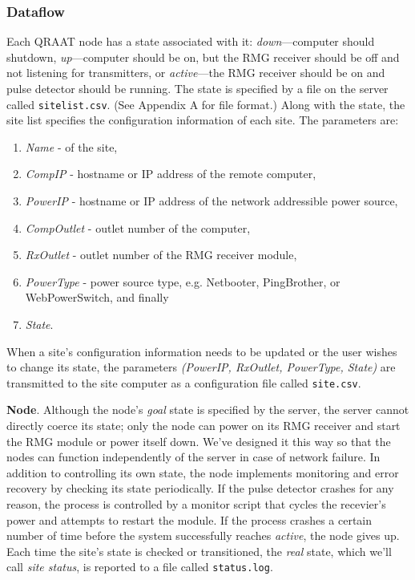 \documentclass[letter]{article}
\begin{document}
\subsubsection{Dataflow}
Each QRAAT node has a state associated with it: \textit{down}---computer should shutdown,
\textit{up}---computer should be on, but the RMG receiver should be off and not listening 
for transmitters, or \textit{active}---the RMG receiver should be on and pulse detector should
be running. The state is specified by a file on the server called \texttt{sitelist.csv}.
(See Appendix A for file format.) Along with the state, the site list specifies the 
configuration information of each site. The parameters are:
\begin{enumerate}
  \item \textit{Name} - of the site, 
  \item \textit{CompIP} - hostname or IP address of the remote computer, 
  \item \textit{PowerIP} - hostname or IP address of the network addressible power source,
  \item \textit{CompOutlet} - outlet number of the computer, 
  \item \textit{RxOutlet} - outlet number of the RMG receiver module, 
  \item \textit{PowerType} - power source type, e.g. Netbooter, PingBrother, or WebPowerSwitch, and finally
  \item \textit{State}.
\end{enumerate}

When a site's configuration information needs to be updated or the user wishes to change 
its state, the parameters \textit{(PowerIP, RxOutlet, PowerType, State)} are transmitted to the
site computer as a configuration file called \texttt{site.csv}. 

\textbf{Node}. Although the node's \textit{goal} state is specified by the server, the server
cannot directly coerce its state; only the node can power on its RMG receiver and start the RMG
module or power itself down. We've designed it this way so that the nodes can function independently
of the server in case of network failure. In addition to controlling its own state, the node 
implements monitoring and error recovery by checking its state periodically. If the pulse detector
crashes for any reason, the process is controlled by a monitor script that cycles the recevier's 
power and attempts to restart the module. If the process crashes a certain number of time before 
the system successfully reaches \textit{active}, the node gives up. Each time the site's state is 
checked or transitioned, the \textit{real} state, which we'll call \textit{site status}, is 
reported to a file called \texttt{status.log}. 
\end{document}
